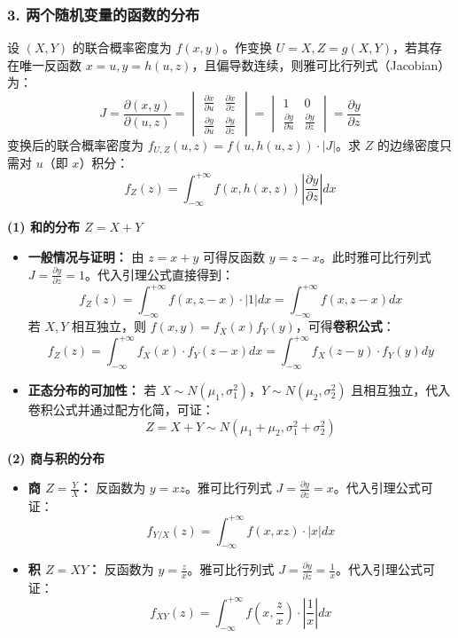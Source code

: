 \vspace{1em}
\subsubsection*{3. 两个随机变量的函数的分布}

\begin{新引理}[二维随机变量变换的雅可比行列式法]
	设 $(X, Y)$ 的联合概率密度为 $f(x, y)$。作变换 $U = X, Z = g(X, Y)$，若其存在唯一反函数 $x = u, y = h(u, z)$，且偏导数连续，则雅可比行列式（Jacobian）为：
	$$ J = \frac{\partial(x, y)}{\partial(u, z)} = \begin{vmatrix} \frac{\partial x}{\partial u} & \frac{\partial x}{\partial z} \\ \frac{\partial y}{\partial u} & \frac{\partial y}{\partial z} \end{vmatrix} = \begin{vmatrix} 1 & 0 \\ \frac{\partial y}{\partial u} & \frac{\partial y}{\partial z} \end{vmatrix} = \frac{\partial y}{\partial z} $$
	变换后的联合概率密度为 $f_{U,Z}(u, z) = f(u, h(u, z)) \cdot |J|$。求 $Z$ 的边缘密度只需对 $u$（即 $x$）积分：
	$$ f_Z(z) = \int_{-\infty}^{+\infty} f(x, h(x, z)) \left| \frac{\partial y}{\partial z} \right| dx $$
\end{新引理}

\textbf{(1) 和的分布 \quad $Z = X + Y$}
\begin{itemize}
    \item \textbf{一般情况与证明：} 由 $z = x + y$ 可得反函数 $y = z - x$。此时雅可比行列式 $J = \frac{\partial y}{\partial z} = 1$。代入引理公式直接得到：
    $$ f_Z(z) = \int_{-\infty}^{+\infty} f(x, z-x) \cdot |1| dx = \int_{-\infty}^{+\infty} f(x, z-x) dx $$
    若 $X, Y$ 相互独立，则 $f(x,y) = f_X(x)f_Y(y)$，可得\textbf{卷积公式}：
    $$ f_Z(z) = \int_{-\infty}^{+\infty} f_X(x) \cdot f_Y(z-x) dx = \int_{-\infty}^{+\infty} f_X(z-y) \cdot f_Y(y) dy $$
    \item \textbf{正态分布的可加性：} 若 $X \sim N(\mu_1, \sigma_1^2)$，$Y \sim N(\mu_2, \sigma_2^2)$ 且相互独立，代入卷积公式并通过配方化简，可证：
    $$ Z = X + Y \sim N(\mu_1 + \mu_2, \sigma_1^2 + \sigma_2^2) $$
\end{itemize}

\textbf{(2) 商与积的分布} 
\begin{itemize}
    \item \textbf{商 $Z = \frac{Y}{X}$：} 反函数为 $y = xz$。雅可比行列式 $J = \frac{\partial y}{\partial z} = x$。代入引理公式可证：
    $$ f_{Y/X}(z) = \int_{-\infty}^{+\infty} f(x, xz) \cdot |x| dx $$
    \item \textbf{积 $Z = XY$：} 反函数为 $y = \frac{z}{x}$。雅可比行列式 $J = \frac{\partial y}{\partial z} = \frac{1}{x}$。代入引理公式可证：
    $$ f_{XY}(z) = \int_{-\infty}^{+\infty} f\left(x, \frac{z}{x}\right) \cdot \left| \frac{1}{x} \right| dx $$
\end{itemize}

